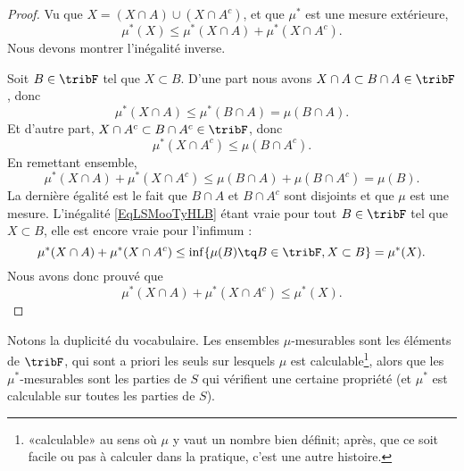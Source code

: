 \begin{proof}
    Vu que \( X=(X\cap A)\cup(X\cap A^c)\), et que \( \mu^*\) est une mesure extérieure,
    \begin{equation}
        \mu^*(X)\leq \mu^*(X\cap A)+\mu^*(X\cap A^c).
    \end{equation}
    Nous devons montrer l'inégalité inverse.

    Soit \( B\in\tribF\) tel que \( X\subset B\). D'une part nous avons \( X\cap A\subset B\cap A\in\tribF\), donc
    \begin{equation}
        \mu^*(X\cap A)\leq \mu^*(B\cap A)= \mu(B\cap A). 
    \end{equation}
    Et d'autre part, \( X\cap A^c\subset B\cap A^c\in\tribF\), donc
    \begin{equation}
        \mu^*(X\cap A^c)\leq \mu(B\cap A^c). 
    \end{equation}
    En remettant ensemble,
    \begin{equation}    \label{EqLSMooTyHLB}
        \mu^*(X\cap A)+\mu^*(X\cap A^c)\leq \mu(B\cap A)+\mu(B\cap A^c)=\mu(B).
    \end{equation}
    La dernière égalité est le fait que \( B\cap A\) et \( B\cap A^c\) sont disjoints et que \( \mu\) est une mesure. L'inégalité \eqref{EqLSMooTyHLB} étant vraie pour tout \( B\in \tribF\) tel que \( X\subset B\), elle est encore vraie pour l'infimum :
    \begin{equation}
        \mu^*(X\cap A)+\mu^*(X\cap A^c)\leq \inf \{ \mu(B)\tq B\in\tribF,X\subset B \}=\mu^*(X).
    \end{equation}
    Nous avons donc prouvé que 
    \begin{equation}
        \mu^*(X\cap A)+\mu^*(X\cap A^c)\leq \mu^*(X).
    \end{equation}
\end{proof}

\begin{remark}
Notons la duplicité du vocabulaire. Les ensembles \( \mu\)-mesurables sont les éléments de \( \tribF\), qui sont a priori les seuls sur lesquels \( \mu\) est calculable\footnote{«calculable» au sens où \( \mu\) y vaut un nombre bien définit; après, que ce soit facile ou pas à calculer dans la pratique, c'est une autre histoire.}, alors que les \( \mu^*\)-mesurables sont les parties de \( S\) qui vérifient une certaine propriété (et \( \mu^*\) est calculable sur toutes les parties de \( S\)).
\end{remark}

